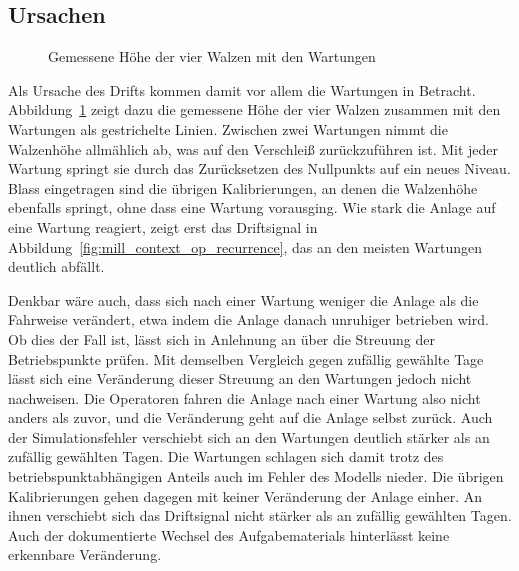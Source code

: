 \subsection{Ursachen} \label{sec:mill_kontext_ursachen}
%
\begin{figure}[tbp]
    \centering
    
    \caption{Gemessene Höhe der vier Walzen mit den Wartungen}
    \label{fig:mill_context_calibrations}
\end{figure}
%
Als Ursache des Drifts kommen damit vor allem die Wartungen in Betracht. Abbildung~\ref{fig:mill_context_calibrations} zeigt dazu die gemessene Höhe der vier Walzen zusammen mit den Wartungen als gestrichelte Linien. Zwischen zwei Wartungen nimmt die Walzenhöhe allmählich ab, was auf den Verschleiß zurückzuführen ist. Mit jeder Wartung springt sie durch das Zurücksetzen des Nullpunkts auf ein neues Niveau. Blass eingetragen sind die übrigen Kalibrierungen, an denen die Walzenhöhe ebenfalls springt, ohne dass eine Wartung vorausging. Wie stark die Anlage auf eine Wartung reagiert, zeigt erst das Driftsignal in Abbildung~\ref{fig:mill_context_op_recurrence}, das an den meisten Wartungen deutlich abfällt. \par
%
Denkbar wäre auch, dass sich nach einer Wartung weniger die Anlage als die Fahrweise verändert, etwa indem die Anlage danach unruhiger betrieben wird. Ob dies der Fall ist, lässt sich in Anlehnung an \cite{igel.2024} über die Streuung der Betriebspunkte prüfen. Mit demselben Vergleich gegen zufällig gewählte Tage lässt sich eine Veränderung dieser Streuung an den Wartungen jedoch nicht nachweisen. Die Operatoren fahren die Anlage nach einer Wartung also nicht anders als zuvor, und die Veränderung geht auf die Anlage selbst zurück. Auch der Simulationsfehler verschiebt sich an den Wartungen deutlich stärker als an zufällig gewählten Tagen. Die Wartungen schlagen sich damit trotz des betriebspunktabhängigen Anteils auch im Fehler des Modells nieder. Die übrigen Kalibrierungen gehen dagegen mit keiner Veränderung der Anlage einher. An ihnen verschiebt sich das Driftsignal nicht stärker als an zufällig gewählten Tagen. Auch der dokumentierte Wechsel des Aufgabematerials hinterlässt keine erkennbare Veränderung. \par
%
